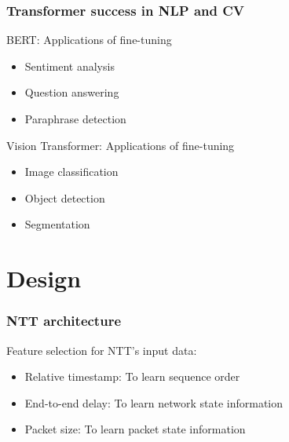 \documentclass{beamer}
\begin{document}


\begin{frame}
\frametitle{Transformer success in NLP and CV}
\pause

BERT: Applications of fine-tuning 

\begin{itemize}  
    \item<1-> Sentiment analysis
    \item<1-> Question answering
    \item<1-> Paraphrase detection
\end{itemize}
\pause

Vision Transformer: Applications of fine-tuning 

\begin{itemize}  
    \item<1-> Image classification
    \item<1-> Object detection
    \item<1-> Segmentation
\end{itemize}



\end{frame}

\section{Design}


\begin{frame}
\frametitle{NTT architecture}

Feature selection for NTT's input data:
\pause 
\begin{itemize}
    \item<1-> \alert{Relative timestamp:} To learn sequence order
    \item<1-> \alert{End-to-end delay:} To learn network state information
    \item<1-> \alert{Packet size:} To learn packet state information
\end{itemize}

\end{frame}
\end{document}

